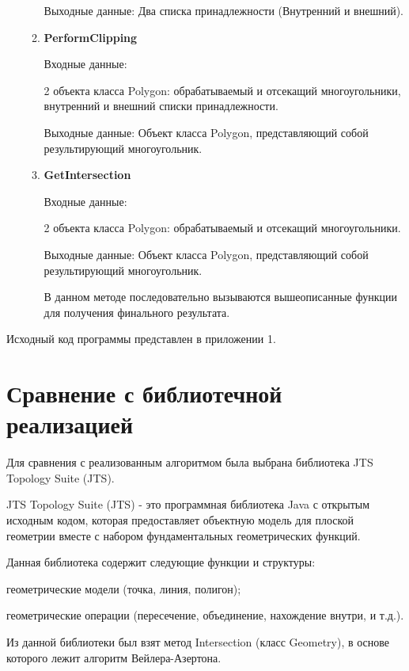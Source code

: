 \documentclass[12pt]{article}
\begin{document}
\begin{enumerate}
\begin{enumerate}
Выходные данные:
 Два списка принадлежности (Внутренний и внешний).


\item { \bf PerformClipping}

Входные данные:

2 объекта класса Polygon: обрабатываемый и отсекащий многоугольники, внутренний и внешний списки принадлежности.

Выходные данные: 
Объект класса Polygon, представляющий собой результирующий многоугольник.

\item { \bf GetIntersection}


Входные данные:

2 объекта класса Polygon: обрабатываемый и отсекащий многоугольники.

Выходные данные: 
Объект класса Polygon, представляющий собой результирующий многоугольник.


В данном методе последовательно вызываются вышеописанные функции для получения финального результата.


\end{enumerate}

 
\end{enumerate}




Исходный код программы представлен в приложении 1.









\section{Сравнение с библиотечной реализацией}


Для сравнения с реализованным алгоритмом была выбрана библиотека JTS Topology Suite (JTS).

JTS Topology Suite (JTS) - это программная библиотека Java с открытым исходным кодом, которая предоставляет объектную модель для плоской геометрии вместе с набором фундаментальных геометрических функций. 



Данная библиотека содержит следующие функции и структуры:  

геометрические модели (точка, линия, полигон);

геометрические операции (пересечение, объединение, нахождение внутри, и т.д.).

Из данной библиотеки был взят метод Intersection (класс Geometry), в основе которого лежит алгоритм Вейлера-Азертона.
\end{document}
